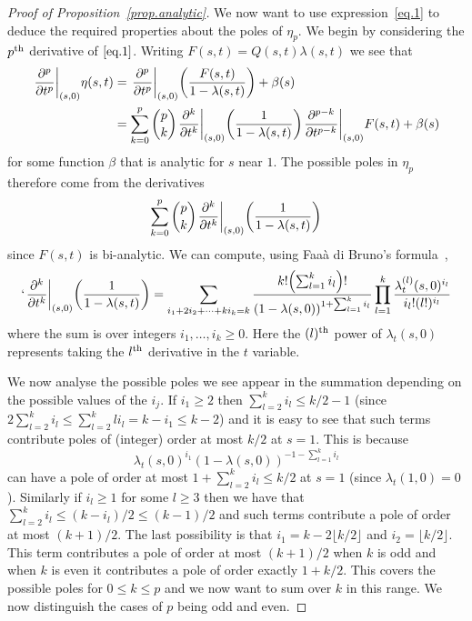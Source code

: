 \documentclass[AHL,Unicode,longabstracts,published]{cedram}
\let\originalleft\left
\let\originalright\right
\renewcommand{\left}{\mathopen{}\mathclose\bgroup\originalleft}
\renewcommand{\right}{\aftergroup\egroup\originalright}
\newcounter{setofcase}
\newcounter{case}[setofcase]
\theoremstyle{plain}
\begin{document}
\begin{proof}[Proof of Proposition~\ref{prop.analytic}]
We now want to use expression~\eqref{eq.1} to deduce the required properties about the poles of $\eta_p$. We begin by considering the $p^{\rm th}$ derivative of $\eqref{eq.1}$. Writing $F(s,t) = Q(s,t) \lambda(s,t)$ we see that
\begin{align*}
\left.\frac{\partial^p }{\partial t^p}\right|_{(s,0)} \eta(s,t) &= \left.\frac{\partial^p }{\partial t^p}\right|_{(s,0)} \left(\frac{F(s,t)}{1 - \lambda(s,t)} \right) + \beta(s) \\
&= \sum_{k=0}^p\binom {p}{k}\left. \frac{\partial^k }{\partial t^k}\right|_{(s,0)} \left(\frac{1}{1 - \lambda(s,t)} \right) \left. \frac{\partial^{p-k} }{\partial t^{p-k}}\right|_{(s,0)} F(s,t) + \beta(s)
\end{align*}
for some function $\beta$ that is analytic for $s$ near $1$. The possible poles in $\eta_p$ therefore come from the derivatives
\begin{equation}\label{eq.2}
\sum_{k=0}^p\binom { p}{k}\left. \frac{\partial^k }{\partial t^k}\right|_{(s,0)} \left(\frac{1}{1 - \lambda(s,t)} \right)
\end{equation}
since $F(s,t)$ is bi-analytic. We can compute, using Faaà di Bruno's formula~\cite{Faa},
\[`
\left. \frac{\partial^k }{\partial t^k}\right|_{(s,0)} \left(\frac{1}{1 - \lambda(s,t)} \right) = \sum_{i_1 + 2i_2 + \dots + ki_k = k} \frac{k! \left(\sum_{l=1}^k i_l\right)!}{(1 - \lambda(s,0))^{1 + \sum_{l=1}^k i_l}} \prod_{l=1}^k \frac{\lambda_t^{(l)}(s,0)^{i_l}}{i_l!(l!)^{i_l}}
\]
where the sum is over integers $i_1, \dots, i_k \ge 0$. Here the $(l)^{\rm th}$ power of $\lambda_t(s,0)$ represents taking the $l^{\rm th}$ derivative in the $t$ variable.

We now analyse the possible poles we see appear in the summation depending on the possible values of the $i_j$. If $i_1 \ge 2$ then $\sum_{l=2}^k i_l \le k/2 - 1$ (since $2\sum_{l=2}^k i_l \le \sum_{l=2}^k li_l = k - i_1 \le k - 2$) and it is easy to see that such terms contribute poles of (integer) order at most $k/2$ at $s=1$. This is because
\[
\lambda_t(s,0)^{i_1}(1-\lambda(s,0))^{-1-\sum\limits_{l=1}^k i_l}
\]
can have a pole of order at most $1+\sum_{l=2}^k i_l \le k/2$ at $s=1$ (since $\lambda_t(1,0)=0$). Similarly if $i_l \ge 1$ for some $l \ge 3$ then we have that $\sum_{l=2}^k i_l \le (k-i_l)/2 \le(k- 1)/2 $ and such terms contribute a pole of order at most $(k+1)/2$. The last possibility is that $i_1 = k - 2\lfloor k/2 \rfloor$ and $i_2 = \lfloor k/2 \rfloor$. This term contributes a pole of order at most $(k+1)/2$ when $k$ is odd and when $k$ is even it contributes a pole of order exactly $1+k/2$. This covers the possible poles for $0 \le k \le p$ and we now want to sum over $k$ in this range. We now distinguish the cases of $p$ being odd and even.


\end{proof}
\end{document}
